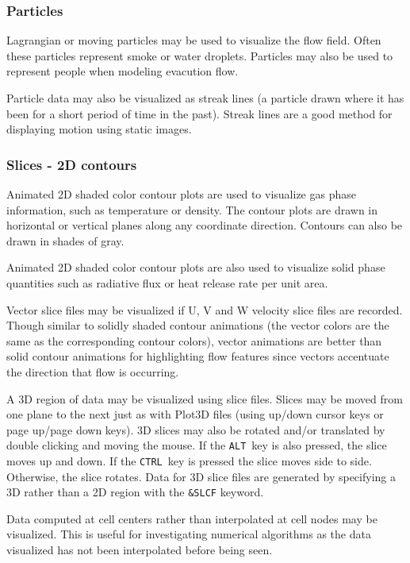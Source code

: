 \documentclass[11pt,twoside]{book}
\begin{document}
\subsubsection{Particles} Lagrangian or moving particles may be
used to visualize the flow field. Often these particles represent
smoke or water droplets.  Particles may also be used to represent
people when modeling evacution flow.

Particle data may also be visualized as streak lines (a particle
drawn where it has been for a short period of time in the past).
Streak lines are a good method for displaying motion using static
images.

\subsubsection{Slices - 2D contours} Animated 2D shaded color contour plots are
used to visualize gas phase information, such as temperature or
density. The contour plots are drawn in horizontal or vertical
planes along any coordinate direction.  Contours can also be drawn
in shades of gray.

Animated 2D shaded color contour plots are also used to
visualize solid phase quantities such as radiative flux or
heat release rate per unit area.

Vector slice files may be visualized if U, V and W velocity slice files are recorded.
Though
similar to solidly shaded contour animations (the vector colors are
the same as the corresponding contour colors), vector animations are better
than solid contour animations for highlighting flow
features since vectors accentuate the direction that flow is occurring.

A 3D region of
data may be visualized using slice files.  Slices may be moved from one plane to
the next just as with Plot3D files (using up/down cursor keys or
page up/page down keys).
3D slices may also be rotated and/or translated by double clicking and moving the mouse. If the {\tt ALT}\ key
is also pressed, the slice moves up and down.  If the {\tt CTRL}\ key is pressed the slice moves side to side.
Otherwise, the slice rotates.
Data for 3D slice files are generated by specifying a 3D rather than a 2D region with the {\tt \&SLCF} keyword.

Data computed at cell centers rather than interpolated at cell nodes may be visualized.
This is useful for investigating numerical algorithms as the data visualized has not been interpolated before being seen.
\end{document}
